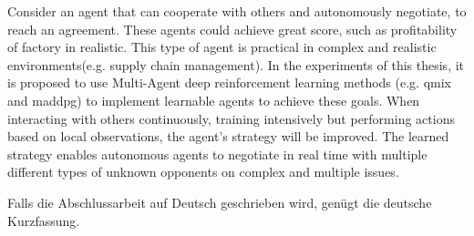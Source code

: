 
Consider an agent that can cooperate with others and autonomously negotiate, to reach an agreement. These agents could achieve great score, such as profitability of factory in realistic. This type of agent is practical in complex and realistic environments(e.g. supply chain management). In the experiments of this thesis, it is proposed to use Multi-Agent deep reinforcement learning methods (e.g. \gls{qmix} and \gls{maddpg}) to implement learnable agents to achieve these goals. When interacting with others continuously, training intensively but performing actions based on local observations, the agent’s strategy will be improved. The learned strategy enables autonomous agents to negotiate in real time with multiple different types of unknown opponents  on complex and multiple issues.


Falls die Abschlussarbeit auf Deutsch geschrieben wird, genügt die deutsche Kurzfassung.
